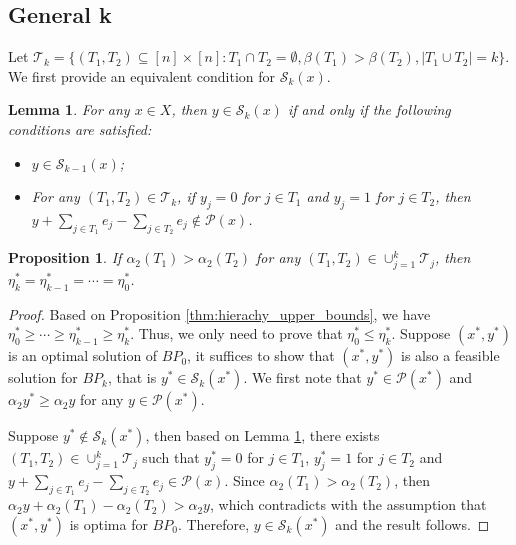 \documentclass[11pt]{article}
\newtheorem{lemma}{Lemma}
\newtheorem{proposition}{Proposition}
\newcommand{\T}{\mathcal{T}}
\newcommand{\Pp}{\mathcal{P}}
\newcommand{\Ss}{\mathcal{S}}
\begin{document}
\subsection{General k}
Let $\T_k = \{ (T_1, T_2)\subseteq [n]\times [n]: T_1\cap T_2 = \emptyset, \beta(T_1) > \beta(T_2), |T_1\cup T_2|=k\}$. We first provide an equivalent condition for $\Ss_k(x)$. 
\begin{lemma}\label{thm:opt_condition_k}
	For any $x\in X$, then $y\in \Ss_k(x)$ if and only if the following conditions are satisfied:
	\begin{itemize}
		\item[\emph{(i)}] $y\in \Ss_{k-1}(x)$; 
		\item[\emph{(ii)}] For any $(T_1, T_2) \in \T_k$, if $y_j = 0$ for $j\in T_1$ and $y_j = 1$ for $j\in T_2$, then $y + \sum_{j\in T_1} e_j - \sum_{j\in T_2} e_j \notin \Pp(x)$.
	\end{itemize}
\end{lemma}

\begin{proposition}
	If $\alpha_2(T_1) > \alpha_2(T_2)$ for any $(T_1, T_2) \in \cup_{j=1}^k \T_j$, then $\eta^*_k = \eta^*_{k-1} = \cdots = \eta^*_0$.
\end{proposition}
\begin{proof}
	Based on Proposition \ref{thm:hierachy_upper_bounds}, we have $\eta^*_0 \geq \cdots \geq \eta^*_{k-1} \geq \eta^*_k$. Thus, we only need to prove that $\eta^*_0 \leq \eta^*_k$. Suppose $(x^*, y^*)$ is an optimal solution of $BP_{0}$, it suffices to show that $(x^*, y^*)$ is also a feasible solution for $BP_k$, that is $y^* \in \Ss_k(x^*)$. We first note that $y^* \in \Pp(x^*)$ and $\alpha_2 y^* \geq \alpha_2 y$ for any $y \in \Pp(x^*)$.
	
	Suppose $y^* \notin \Ss_k(x^*)$, then based on Lemma \ref{thm:opt_condition_k}, there exists $(T_1, T_2) \in \cup_{j=1}^k \T_j$ such that $y^*_j = 0$ for $j\in T_1$, $y^*_j = 1$ for $j\in T_2$ and $y + \sum_{j\in T_1} e_j - \sum_{j\in T_2} e_j \in \Pp(x)$.  Since $\alpha_2(T_1) > \alpha_2(T_2)$, then $\alpha_2 y + \alpha_2(T_1) - \alpha_2(T_2) > \alpha_2y$, which contradicts with the assumption that $(x^*, y^*)$ is optima for $BP_0$. Therefore, $y\in \Ss_k(x^*)$ and the result follows.
\end{proof}
\end{document}
